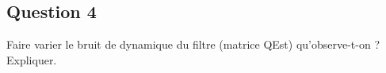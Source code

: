 \documentclass[../CSC_5RO12_TA_TP2.tex]{subfiles}
\begin{document}
\subsection{Question 4}

Faire varier le bruit de dynamique du filtre (matrice QEst) qu'observe-t-on ? Expliquer.
\end{document}
